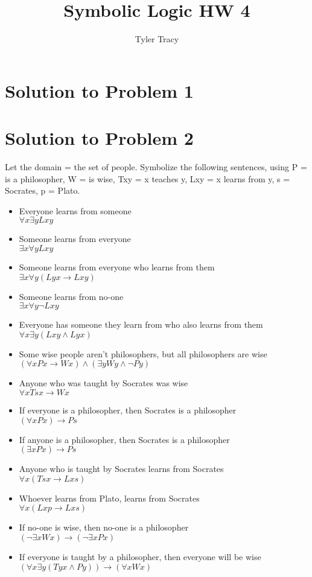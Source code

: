 \documentclass[12pt]{article}
\title{Symbolic Logic HW 4}
\author{Tyler Tracy}
\begin{document}
\section*{Solution to Problem 1}

\section*{Solution to Problem 2}

Let the domain = the set of people. Symbolize the following sentences, using P = is a philosopher, W = is wise, Txy = x teaches y, Lxy = x learns from y, s = Socrates, p = Plato. 

\begin{itemize}
    \item Everyone learns from someone \\
        $\forall x \exists y Lxy$
    \item Someone learns from everyone \\
        $\exists x \forall y Lxy$
    \item Someone learns from everyone who learns from them \\
        $\exists x \forall y (Lyx \rightarrow Lxy)$
    \item Someone learns from no-one \\
        $\exists x \forall y \neg Lxy$
    \item Everyone has someone they learn from who also learns from them \\
        $\forall x \exists y (Lxy \land Lyx) $
    \item Some wise people aren’t philosophers, but all philosophers are wise \\
        $(\forall x Px \rightarrow Wx) \land (\exists y Wy \land \lnot Py)$
    \item Anyone who was taught by Socrates was wise  \\
        $\forall x Tsx \rightarrow Wx$
    \item If everyone is a philosopher, then Socrates is a philosopher \\
        $(\forall x Px) \rightarrow Ps$
    \item If anyone is a philosopher, then Socrates is a philosopher \\
        $(\exists x Px) \rightarrow Ps$
    \item Anyone who is taught by Socrates learns from Socrates \\
        $\forall x (Tsx \rightarrow Lxs)$
    \item Whoever learns from Plato, learns from Socrates \\
        $\forall x (Lxp \rightarrow Lxs)$
    \item If no-one is wise, then no-one is a philosopher \\
        $(\lnot \exists x Wx) \rightarrow (\lnot \exists x Px) $
    \item If everyone is taught by a philosopher, then everyone will be wise\\
        $(\forall x \exists y (Tyx \land Py)) \rightarrow (\forall x Wx)$
\end{itemize}
\end{document}
